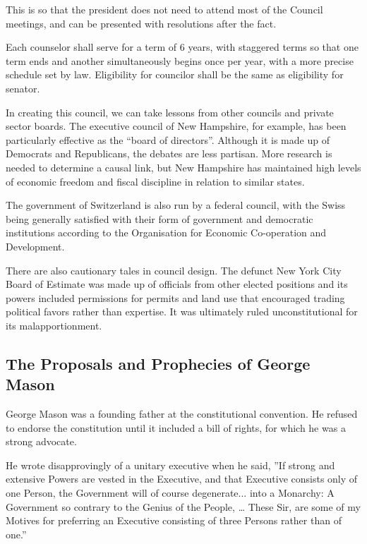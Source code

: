 \documentclass{article}
\begin{document}
This is so that the president does not need to attend most of the Council meetings, and can be presented with resolutions after the fact.

\begin{quoting}
Each counselor shall serve for a term of 6 years, with staggered terms so that one term ends and another simultaneously begins once per year, with a more precise schedule set by law. Eligibility for councilor shall be the same as eligibility for senator.
\end{quoting}

In creating this council, we can take lessons from other councils and private sector boards\cite{Khanna}. The executive council of New Hampshire, for example, has been particularly effective as the “board of directors”\cite{Hahn-Burkett}. Although it is made up of Democrats and Republicans, the debates are less partisan\cite{Timmins}. More research is needed to determine a causal link, but New Hampshire has maintained high levels of economic freedom and fiscal discipline in relation to similar states\cite{Ruger}.

The government of Switzerland is also run by a federal council, with the Swiss being generally satisfied with their form of government and democratic institutions according to the Organisation for Economic Co-operation and Development\cite{Kaufman}.

There are also cautionary tales in council design. The defunct New York City Board of Estimate was made up of officials from other elected positions and its powers included permissions for permits and land use that encouraged trading political favors rather than expertise\cite{Purnick}. It was ultimately ruled unconstitutional for its malapportionment\cite{Board_of_Estimate}.

\subsection{The Proposals and Prophecies of George Mason}

George Mason was a founding father at the constitutional convention. He refused to endorse the constitution until it included a bill of rights, for which he was a strong advocate.

He wrote disapprovingly of a unitary executive when he said, ”If strong and extensive Powers are vested in the Executive, and that Executive consists only of one Person, the Government will of course degenerate... into a Monarchy: A Government so contrary to the Genius of the People, … These Sir, are some of my Motives for preferring an Executive consisting of three Persons rather than of one.”\cite{Mason}
\end{document}
